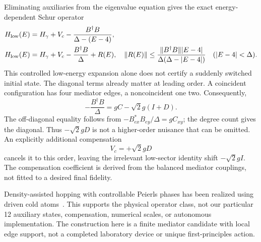 \documentclass[11pt,a4paper]{article}
\begin{document}
Eliminating auxiliaries from the eigenvalue equation gives the exact
energy-dependent Schur operator
\begin{align}
 H_{\rm low}(E)&=H_\gamma+V_c-
       \frac{B^\dagger B}{\Delta-(E-4)},\\
 H_{\rm low}(E)&=H_\gamma+V_c-\frac{B^\dagger B}{\Delta}+R(E),\quad
 \|R(E)\|\le\frac{\|B^\dagger B\||E-4|}
 {\Delta(\Delta-|E-4|)}\quad(|E-4|<\Delta).
\end{align}
This controlled low-energy expansion alone does not certify a suddenly
switched initial state. The diagonal terms already matter at leading
order. A coincident configuration has four mediator edges, a
noncoincident one two. Consequently,
\begin{equation}
 -\frac{B^\dagger B}{\Delta}
       =gC-\sqrt2g(I+D).\label{stark}
\end{equation}
The off-diagonal equality follows from
$-B_{ex}^*B_{ey}/\Delta=gC_{xy}$; the degree count gives the diagonal.
Thus $-\sqrt2gD$ is not a higher-order nuisance that can be omitted.
An explicitly additional compensation
\begin{equation}
 V_c=+\sqrt2gD\label{compensation}
\end{equation}
cancels it to this order, leaving the irrelevant low-sector identity
shift $-\sqrt2gI$. The compensation coefficient is derived from the
balanced mediator couplings, not fitted to a desired final fidelity.

Density-assisted hopping with controllable Peierls phases has been
realized using driven cold atoms~\cite{gorg}. This supports the physical
operator class, not our particular 12 auxiliary states, compensation,
numerical scales, or autonomous implementation. The construction here
is a finite mediator candidate with local edge support, not a completed
laboratory device or unique first-principles action.

\newpage
\end{document}
